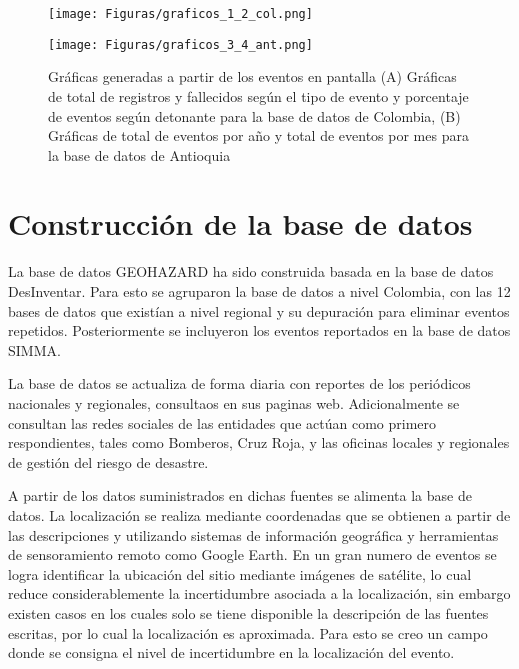 \documentclass{article}
\begin{document}
\begin{figure}[ht!]
  \begin{minipage}{.48\linewidth}
    \centering
      {\texttt{[image: Figuras/graficos\_1\_2\_col.png]}}
  \end{minipage}\quad
  \begin{minipage}{.48\linewidth}
    \centering
      {\texttt{[image: Figuras/graficos\_3\_4\_ant.png]}}
  \end{minipage}
    \caption{Gráficas generadas a partir de los eventos en pantalla (A) Gráficas de total de registros y fallecidos según el tipo de evento y porcentaje de eventos según detonante para la base de datos de Colombia, (B) Gráficas de total de eventos por año y total de eventos por mes para la base de datos de Antioquia}
    \label{fig:data}
\end{figure}


\section{Construcción de la base de datos}
La base de datos GEOHAZARD ha sido construida basada en la base de datos DesInventar. Para esto se agruparon la base de datos a nivel Colombia, con las 12 bases de datos que existían a nivel regional y su depuración para eliminar eventos repetidos. Posteriormente se incluyeron los eventos reportados en la base de datos SIMMA.

La base de datos se actualiza de forma diaria con reportes de los periódicos nacionales y regionales, consultaos en sus paginas web. Adicionalmente se consultan las redes sociales de las entidades que actúan como primero respondientes, tales como Bomberos, Cruz Roja, y las oficinas locales y regionales de gestión del riesgo de desastre.

A partir de los datos suministrados en dichas fuentes se alimenta la base de datos. La localización se realiza mediante coordenadas que se obtienen a partir de las descripciones y utilizando sistemas de información geográfica y herramientas de sensoramiento remoto como Google Earth. En un gran numero de eventos se logra identificar la ubicación del sitio mediante imágenes de satélite, lo cual reduce considerablemente la incertidumbre asociada a la localización, sin embargo existen casos en los cuales solo se tiene disponible la descripción de las fuentes escritas, por lo cual la localización es aproximada. Para esto se creo un campo donde se consigna el nivel de incertidumbre en la localización del evento.
\end{document}

